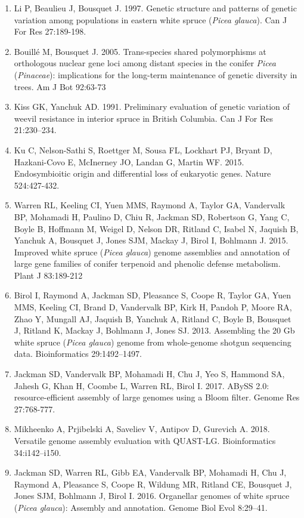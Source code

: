 \documentclass[titlepage,11pt, oneside]{article}   	%
\begin{document}
\begin{enumerate}
\item  Li P, Beaulieu J, Bousquet J. 1997. Genetic structure and patterns of genetic variation among populations in eastern white spruce (\textit{Picea glauca}). Can J For Res 27:189-198.
\item Bouillé M, Bousquet J. 2005. Trans-species shared polymorphisms at orthologous nuclear gene loci among distant species in the conifer \textit{Picea} (\textit{Pinaceae}): implications for the long-term maintenance of genetic diversity in trees. Am J Bot 92:63-73
\item Kiss GK, Yanchuk AD. 1991. Preliminary evaluation of genetic variation of weevil resistance in interior spruce in British Columbia. Can J For Res 21:230–234.
\item Ku C, Nelson-Sathi S, Roettger M, Sousa FL, Lockhart PJ, Bryant D, Hazkani-Covo E, McInerney JO, Landan G, Martin WF. 2015. Endosymbioitic origin and differential loss of eukaryotic genes. Nature 524:427-432.
\item Warren RL, Keeling CI, Yuen MMS, Raymond A, Taylor GA, Vandervalk BP, Mohamadi H, Paulino D, Chiu R, Jackman SD, Robertson G, Yang C, Boyle B, Hoffmann M, Weigel D, Nelson DR, Ritland C, Isabel N, Jaquish B, Yanchuk A, Bousquet J, Jones SJM, Mackay J, Birol I, Bohlmann J. 2015. Improved white spruce (\textit{Picea glauca}) genome assemblies and annotation of large gene families of conifer terpenoid and phenolic defense metabolism. Plant J 83:189-212
\item Birol I, Raymond A, Jackman SD, Pleasance S, Coope R, Taylor GA, Yuen MMS, Keeling CI, Brand D, Vandervalk BP, Kirk H, Pandoh P, Moore RA, Zhao Y, Mungall AJ, Jaquish B, Yanchuk A, Ritland C, Boyle B, Bousquet J, Ritland K, Mackay J, Bohlmann J, Jones SJ. 2013. Assembling the 20 Gb white spruce (\textit{Picea glauca}) genome from whole-genome shotgun sequencing data. Bioinformatics 29:1492–1497.
\item Jackman SD, Vandervalk BP, Mohamadi H, Chu J, Yeo S, Hammond SA, Jahesh G, Khan H, Coombe L, Warren RL, Birol I. 2017. ABySS 2.0: resource-efficient assembly of large genomes using a Bloom filter. Genome Res 27:768-777.
\item Mikheenko A, Prjibelski A, Saveliev V, Antipov D, Gurevich A. 2018. Versatile genome assembly evaluation with QUAST-LG. Bioinformatics 34:i142–i150.
\item Jackman SD, Warren RL, Gibb EA, Vandervalk BP, Mohamadi H, Chu J, Raymond A, Pleasance S, Coope R, Wildung MR, Ritland CE, Bousquet J, Jones SJM, Bohlmann J, Birol I. 2016. Organellar genomes of white spruce (\textit{Picea glauca}): Assembly and annotation. Genome Biol Evol 8:29–41.

\end{enumerate}
\end{document}
